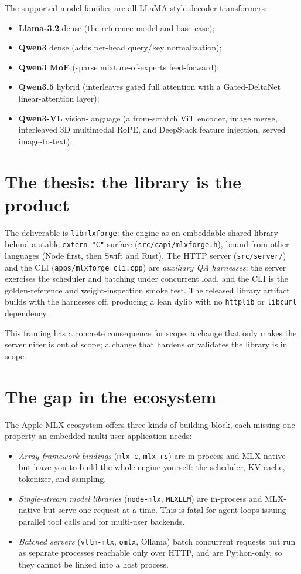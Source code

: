 \documentclass[11pt,a4paper]{report}
\newcommand{\code}[1]{\texttt{#1}}
\begin{document}
The supported model families are all LLaMA-style decoder transformers:
\begin{itemize}[nosep]
  \item \textbf{Llama-3.2} dense (the reference model and base case);
  \item \textbf{Qwen3} dense (adds per-head query/key normalization);
  \item \textbf{Qwen3 MoE} (sparse mixture-of-experts feed-forward);
  \item \textbf{Qwen3.5} hybrid (interleaves gated full attention with a
        Gated-DeltaNet linear-attention layer);
  \item \textbf{Qwen3-VL} vision-language (a from-scratch ViT encoder, image
        merge, interleaved 3D multimodal RoPE, and DeepStack feature injection,
        served image-to-text).
\end{itemize}

\section{The thesis: the library is the product}
The deliverable is \code{libmlxforge}: the engine as an embeddable shared
library behind a stable \code{extern "C"} surface (\code{src/capi/mlxforge.h}),
bound from other languages (Node first, then Swift and Rust). The HTTP server
(\code{src/server/}) and the CLI (\code{apps/mlxforge\_cli.cpp}) are
\emph{auxiliary QA harnesses}: the server exercises the scheduler and
batching under concurrent load, and the CLI is the golden-reference and
weight-inspection smoke test. The released library artifact builds with the
harnesses off, producing a lean dylib with no \code{httplib} or \code{libcurl}
dependency.

This framing has a concrete consequence for scope: a change that only makes the
server nicer is out of scope; a change that hardens or validates the library is in
scope.

\section{The gap in the ecosystem}
The Apple MLX ecosystem offers three kinds of building block, each missing one
property an embedded multi-user application needs:

\begin{itemize}[nosep]
  \item \emph{Array-framework bindings} (\code{mlx-c}, \code{mlx-rs}) are
        in-process and MLX-native but leave you to build the whole engine
        yourself: the scheduler, KV cache, tokenizer, and sampling.
  \item \emph{Single-stream model libraries} (\code{node-mlx},
        \code{MLXLLM}) are in-process and MLX-native but serve one request at a
        time. This is fatal for agent loops issuing parallel tool calls and for
        multi-user backends.
  \item \emph{Batched servers} (\code{vllm-mlx}, \code{omlx}, Ollama) batch
        concurrent requests but run as separate processes reachable only over
        HTTP, and are Python-only, so they cannot be linked into a host process.
\end{itemize}
\end{document}
